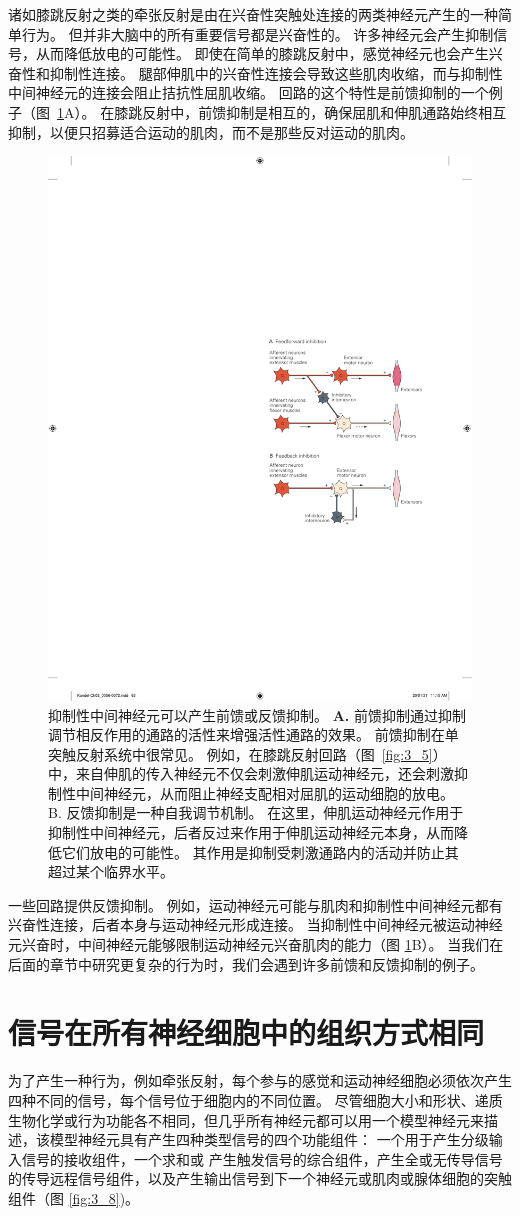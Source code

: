 诸如膝跳反射之类的牵张反射是由在兴奋性突触处连接的两类神经元产生的一种简单行为。 
但并非大脑中的所有重要信号都是兴奋性的。 
许多神经元会产生抑制信号，从而降低放电的可能性。 
即使在简单的膝跳反射中，感觉神经元也会产生兴奋性和抑制性连接。 
腿部伸肌中的兴奋性连接会导致这些肌肉收缩，而与抑制性中间神经元的连接会阻止拮抗性屈肌收缩。 
回路的这个特性是前馈抑制的一个例子（图~\ref{fig:3_7}A）。 
在膝跳反射中，前馈抑制是相互的，确保屈肌和伸肌通路始终相互抑制，以便只招募适合运动的肌肉，而不是那些反对运动的肌肉。

\begin{figure}[htbp]
	\centering
	\includegraphics[width=0.5\linewidth]{chap03/fig_3_7}
	\caption{抑制性中间神经元可以产生前馈或反馈抑制。 
		\textbf{A.} 前馈抑制通过抑制调节相反作用的通路的活性来增强活性通路的效果。 
		前馈抑制在单突触反射系统中很常见。 
		例如，在膝跳反射回路（图~\ref{fig:3_5}）中，来自伸肌的传入神经元不仅会刺激伸肌运动神经元，还会刺激抑制性中间神经元，从而阻止神经支配相对屈肌的运动细胞的放电。 
		B. 反馈抑制是一种自我调节机制。 
		在这里，伸肌运动神经元作用于抑制性中间神经元，后者反过来作用于伸肌运动神经元本身，从而降低它们放电的可能性。 
		其作用是抑制受刺激通路内的活动并防止其超过某个临界水平。}
	\label{fig:3_7}
\end{figure}


一些回路提供反馈抑制。 
例如，运动神经元可能与肌肉和抑制性中间神经元都有兴奋性连接，后者本身与运动神经元形成连接。 
当抑制性中间神经元被运动神经元兴奋时，中间神经元能够限制运动神经元兴奋肌肉的能力（图 \ref{fig:3_7}B）。 
当我们在后面的章节中研究更复杂的行为时，我们会遇到许多前馈和反馈抑制的例子。


\section{信号在所有神经细胞中的组织方式相同}
为了产生一种行为，例如牵张反射，每个参与的感觉和运动神经细胞必须依次产生四种不同的信号，每个信号位于细胞内的不同位置。 
尽管细胞大小和形状、递质生物化学或行为功能各不相同，但几乎所有神经元都可以用一个模型神经元来描述，该模型神经元具有产生四种类型信号的四个功能组件：
一个用于产生分级输入信号的接收组件，一个求和或 产生触发信号的综合组件，产生全或无传导信号的传导远程信号组件，以及产生输出信号到下一个神经元或肌肉或腺体细胞的突触组件（图 \ref{fig:3_8})。


